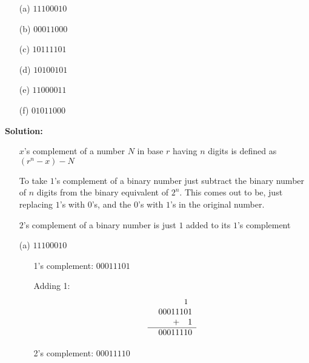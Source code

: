 \documentclass[a4paper,12pt]{article}
\begin{document}
\begin{enumerate}
\begin{enumerate}
    \item[(a)] $11100010$
    \item[(b)] $00011000$
    \item[(c)] $10111101$
    \item[(d)] $10100101$
    \item[(e)] $11000011$
    \item[(f)] $01011000$
\end{enumerate} 
\textbf{Solution:}\newline
\begin{itemize}
    \item[\ding{221}] $x$'s complement of a number $N$ in base $r$ having $n$ digits is defined as $(r^n - x) - N$
    \item[\ding{221}] To take $1$'s complement of a binary number just subtract the binary number of $n$ digits from the binary equivalent of $2^n$. This comes out to be, just replacing $1$'s with $0$'s, and the $0$'s with $1$'s in the original number.
    \item[\ding{221}] $2$'s complement of a binary number is just $1$ added to its $1$'s complement
\end{itemize}
\begin{enumerate}
    \item[(a)] $11100010$
        \begin{itemize}
            \item[\ding{221}] 1’s complement: $00011101$
            \item[\ding{105}] Adding 1:
                  \[
                  \begin{array}{r}
                    \quad \text{\small 1} \phantom{0}\\
                    \phantom{+}00011101 \\
                    +\quad 1 \\
                    \hline
                    00011110 \\
                  \end{array}
                  \]
            \item[\ding{221}] 2’s complement: $00011110$
        \end{itemize}


\end{enumerate}
\end{enumerate}
\end{document}
